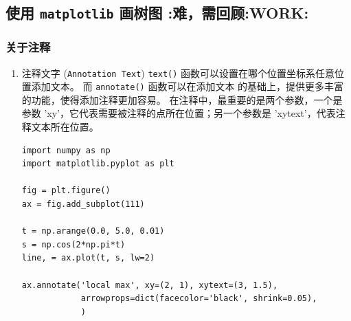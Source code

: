\documentclass[11pt]{ctexart}
\begin{document}
\subsection{使用 \texttt{matplotlib} 画树图                               :难，需回顾:WORK:}
\label{sec:orgheadline31}
\subsubsection{关于注释}
\label{sec:orgheadline27}
\begin{enumerate}
\item 注释文字 (\texttt{Annotation Text})
\label{sec:orgheadline20}
\texttt{text()} 函数可以设置在哪个位置坐标系任意位置添加文本。 而 \texttt{annotate()} 函数可以在添加文本
的基础上，提供更多丰富的功能，使得添加注释更加容易。 在注释中，最重要的是两个参数，一个是参数
'xy'，它代表需要被注释的点所在位置；另一个参数是 'xytext'，代表注释文本所在位置。
\lstset{language=Python,label= ,caption= ,captionpos=b,numbers=none}
\begin{lstlisting}
import numpy as np
import matplotlib.pyplot as plt

fig = plt.figure()
ax = fig.add_subplot(111)

t = np.arange(0.0, 5.0, 0.01)
s = np.cos(2*np.pi*t)
line, = ax.plot(t, s, lw=2)

ax.annotate('local max', xy=(2, 1), xytext=(3, 1.5),
            arrowprops=dict(facecolor='black', shrink=0.05),
            )


\end{lstlisting}
\end{enumerate}
\end{document}

